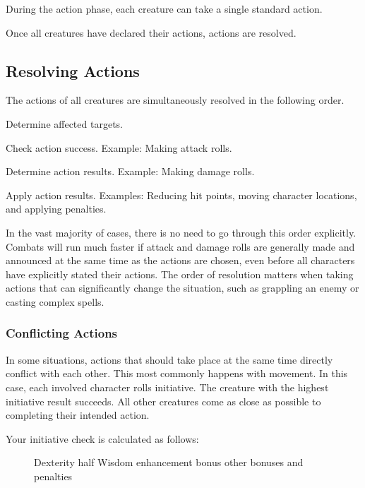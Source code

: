 During the action phase, each creature can take a single standard action.

Once all creatures have declared their actions, actions are resolved.

\subsection{Resolving Actions}\label{Resolving Actions}

The actions of all creatures are simultaneously resolved in the following order.

\begin{enumerate*}
    \item Determine affected targets.
    \item Check action success. Example: Making attack rolls.
    \item Determine action results. Example: Making damage rolls.
    \item Apply action results. Examples: Reducing hit points, moving character locations, and applying penalties.
\end{enumerate*}

In the vast majority of cases, there is no need to go through this order explicitly. Combats will run much faster if attack and damage rolls are generally made and announced at the same time as the actions are chosen, even before all characters have explicitly stated their actions. The order of resolution matters when taking actions that can significantly change the situation, such as grappling an enemy or casting complex spells.

\subsubsection{Conflicting Actions}\label{Conflicting Actions}

In some situations, actions that should take place at the same time directly conflict with each other. This most commonly happens with movement. In this case, each involved character rolls initiative. The creature with the highest initiative result succeeds. All other creatures come as close as possible to completing their intended action.

Your initiative check is calculated as follows:

\begin{figure}[h]
    \centering Dexterity \add half Wisdom \add enhancement bonus \add other bonuses and penalties
\end{figure}

